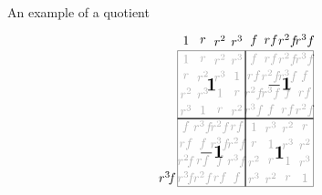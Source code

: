 \documentclass[8pt, handout]{beamer}
\begin{document}
\begin{frame}{An example of a quotient}
\[\begin{tikzpicture}[scale=0.47]
\begin{scope}[shift={(12,0)}]
      \node at (0.4,1.5) {$r^3\!f$};
      \node at (1.5,9.6) {$1$};
      \node at (2.5,9.6) {$r$};
      \node at (3.5,9.6) {$r^2$};
      \node at (4.5,9.6) {$r^3$}; 
      \node at (5.5,9.6) {$f$}; 
      \node at (6.5,9.6) {$rf$};
      \node at (7.5,9.6) {$r^2f$};
      \node at (8.5,9.6) {$r^3f$};
      \node at (1.5,8.5) {$1$};
      \node at (1.5,7.5) {$r$};
      \node at (1.5,6.5) {$r^2$};
      \node at (1.5,5.5) {$r^3$}; 
      \node at (1.5,4.5) {$f$}; 
      \node at (1.5,3.5) {$rf$};
      \node at (1.5,2.5) {$r^2\!f$};
      \node at (1.5,1.5) {$r^3\!f$};
      \node at (2.5,8.5) {$r$};
      \node at (2.5,7.5) {$r^2$};
      \node at (2.5,6.5) {$r^3$};
      \node at (2.5,5.5) {$1$}; 
      \node at (2.5,4.5) {$r^3f$}; 
      \node at (2.5,3.5) {$f$};
      \node at (2.5,2.5) {$rf$};
      \node at (2.5,1.5) {$r^2f$};
      \node at (3.5,8.5) {$r^2$};
      \node at (3.5,7.5) {$r^3$};
      \node at (3.5,6.5) {$1$};
      \node at (3.5,5.5) {$r$}; 
      \node at (3.5,4.5) {$r^2f$}; 
      \node at (3.5,3.5) {$r^3f$};
      \node at (3.5,2.5) {$f$};
      \node at (3.5,1.5) {$rf$};
      \node at (4.5,8.5) {$r^3$};
      \node at (4.5,7.5) {$1$};
      \node at (4.5,6.5) {$r$};
      \node at (4.5,5.5) {$r^2$}; 
      \node at (4.5,4.5) {$rf$}; 
      \node at (4.5,3.5) {$r^2f$};
      \node at (4.5,2.5) {$r^3f$};
      \node at (4.5,1.5) {$f$};
      \node at (5.5,8.5) {$f$};
      \node at (5.5,7.5) {$rf$};
      \node at (5.5,6.5) {$r^2f$};
      \node at (5.5,5.5) {$r^3f$}; 
      \node at (5.5,4.5) {$1$}; 
      \node at (5.5,3.5) {$r$};
      \node at (5.5,2.5) {$r^2$};
      \node at (5.5,1.5) {$r^3$};
      \node at (6.5,8.5) {$rf$};
      \node at (6.5,7.5) {$r^2f$};
      \node at (6.5,6.5) {$r^3f$};
      \node at (6.5,5.5) {$f$}; 
      \node at (6.5,4.5) {$r^3$}; 
      \node at (6.5,3.5) {$1$};
      \node at (6.5,2.5) {$r$};
      \node at (6.5,1.5) {$r^2$};
      \node at (7.5,8.5) {$r^2f$};
      \node at (7.5,7.5) {$r^3f$};
      \node at (7.5,6.5) {$f$};
      \node at (7.5,5.5) {$rf$}; 
      \node at (7.5,4.5) {$r^2$}; 
      \node at (7.5,3.5) {$r^3$};
      \node at (7.5,2.5) {$1$};
      \node at (7.5,1.5) {$r$};
      \node at (8.5,8.5) {$r^3f$};
      \node at (8.5,7.5) {$f$};
      \node at (8.5,6.5) {$rf$};
      \node at (8.5,5.5) {$r^2f$}; 
      \node at (8.5,4.5) {$r$}; 
      \node at (8.5,3.5) {$r^2$};
      \node at (8.5,2.5) {$r^3$};
      \node at (8.5,1.5) {$1$};
      \filldraw[fill=white,opacity=0.7] 
      (1,1)--(9,1)--(9,9)--(1,9)--cycle;
      \draw[thick] (5,1)--(5,9);
      \draw[thick] (1,5)--(9,5);
      \node at (3,7) {\Large $\mathbf{1}$}; %
      \node at (7,7) {\Large $\mathbf{-1}$}; %
      \node at (3,3) {\Large $\mathbf{-1}$}; %
      \node at (7,3) {\Large $\mathbf{1}$}; %
    \end{scope}
  \end{tikzpicture}
  \]
  

\end{frame}
\end{document}
